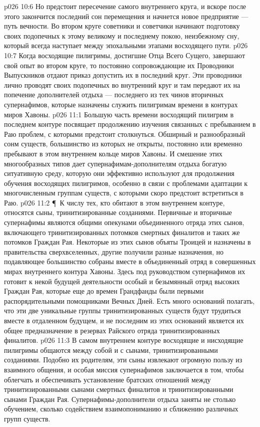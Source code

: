 \vs p026 10:6 Но предстоит пересечение самого внутреннего круга, и вскоре после этого закончится последний сон перемещения и начнется новое предприятие --- путь вечности. Во втором круге советники и советчики начинают подготовку своих подопечных к этому великому и последнему покою, неизбежному сну, который всегда наступает между эпохальными этапами восходящего пути.
\vs p026 10:7 Когда восходящие пилигримы, достигшие Отца Всего Сущего, завершают свой опыт во втором круге, то постоянно сопровождающие их Проводники Выпускников отдают приказ допустить их в последний круг. Эти проводники лично проводят своих подопечных во внутренний круг и там передают их на попечение дополнителей отдыха --- последнего из тех чинов вторичных супернафимов, которые назначены служить пилигримам времени в контурах миров Хавоны.
\vs p026 11:1 Большую часть времени восходящий пилигрим в последнем контуре посвящает продолжению изучения связанных с пребыванием в Раю проблем, с которыми предстоит столкнуться. Обширный и разнообразный сонм существ, большинство из которых не открыты, постоянно или временно пребывают в этом внутреннем кольце миров Хавоны. И смешение этих многообразных типов дает супернафимам\hyp{}дополнителям отдыха богатую ситуативную среду, которую они эффективно используют для продолжения обучения восходящих пилигримов, особенно в связи с проблемами адаптации к многочисленным группам существ, с которыми скоро предстоит встретиться в Раю.
\vs p026 11:2 \P\ К числу тех, кто обитают в этом внутреннем контуре, относятся сыны, тринитизированные созданиями. Первичные и вторичные супернафимы являются общими опекунами объединенного отряда этих сынов, включающего тринитизированных потомков смертных финалитов и таких же потомков Граждан Рая. Некоторые из этих сынов объяты Троицей и назначены в правительства сверхвселенных, другие получили разные назначения, но подавляющее большинство собраны вместе в объединенный отряд в совершенных мирах внутреннего контура Хавоны. Здесь под руководством супернафимов их готовит к некой будущей деятельности особый и безымянный отряд высоких Граждан Рая, которые еще до времен Грандфанды были первыми распорядительными помощниками Вечных Дней. Есть много оснований полагать, что эти две уникальные группы тринитизированных существ будут трудиться вместе в отдаленном будущем, и не последним из этих оснований является их общее предназначение в резервах Райского отряда тринитизированных финалитов.
\vs p026 11:3 В самом внутреннем контуре восходящие и нисходящие пилигримы общаются между собой и с сынами, тринитизированными созданиями. Подобно их родителям, эти сыны извлекают огромную пользу из взаимного общения, и особая миссия супернафимов заключается в том, чтобы облегчать и обеспечивать установление братских отношений между тринитизированными сынами смертных финалитов и тринитизированными сынами Граждан Рая. Супернафимы\hyp{}дополнители отдыха заняты не столько обучением, сколько содействием взаимопониманию и сближению различных групп существ.
